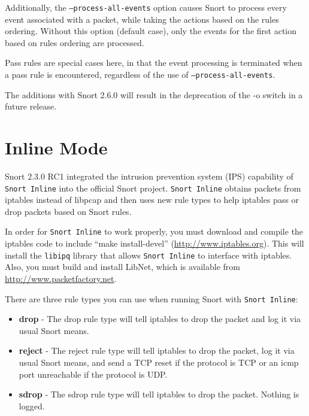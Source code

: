\documentclass[english]{report}
\newenvironment{note}{
\samepage
    \vspace{10pt}{\textsf{
        {\hspace{7pt}\Huge{$\triangle$\hspace{-12.5pt}{\Large{$^!$}}}}\hspace{5pt}
        {\Large{NOTE}}
    }
    }
   \begin{center}
    \par\vspace{-17pt}

    \begin{lrbox}{\savepar}
    \begin{minipage}[r]{6in}
}
{
    \end{minipage}
    \end{lrbox}
    \fbox{
        \usebox{
            \savepar
	}
    }
    \par\vskip10pt
    \end{center}
}
\begin{document}
Additionally, the \texttt{--process-all-events} option causes Snort to
process every event associated with a packet, while taking the actions
based on the rules ordering.  Without this option (default case), only
the events for the first action based on rules ordering are processed.

\begin{note}
Pass rules are special cases here, in that the event processing is
terminated when a pass rule is encountered, regardless of the use of
\texttt{--process-all-events}.
\end{note}

\begin{note}
The additions with Snort 2.6.0 will result in the deprecation of the
-o switch in a future release.
\end{note}

\section{Inline Mode\label{Snort Inline}}

Snort 2.3.0 RC1 integrated the intrusion prevention system (IPS) capability of
\texttt{Snort Inline} into the official Snort project. \texttt{Snort Inline} obtains packets
from iptables instead of libpcap and then uses new rule types to help iptables
pass or drop packets based on Snort rules.  

In order for \texttt{Snort Inline} to work properly, you must download and compile the
iptables code to include ``make install-devel''
(\url{http://www.iptables.org}).  This will install the \texttt{libipq} library
that allows \texttt{Snort Inline} to interface with iptables.  Also, you must build and
install LibNet, which is available from \url{http://www.packetfactory.net}.

There are three rule types you can use when running Snort with \texttt{Snort Inline}:

\begin{itemize}
\item \textbf{drop} - The drop rule type will tell iptables to drop the packet and log it 
       via usual Snort means.
\item \textbf{reject} - The reject rule type will tell iptables to drop the packet, log it 
         via usual Snort means, and send a TCP reset if the protocol is 
         TCP or an icmp port unreachable if the protocol is UDP.
\item \textbf{sdrop} - The sdrop rule type will tell iptables to drop the packet.  Nothing
        is logged.
\end{itemize}
\end{document}
